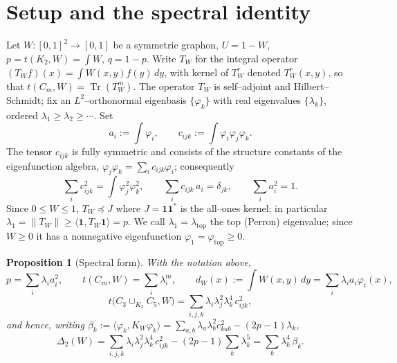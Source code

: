 \documentclass[11pt]{article}
\newtheorem{proposition}[theorem]{Proposition}
\theoremstyle{definition}
\newcommand{\one}{\mathbf 1}
\newcommand{\Tr}{\operatorname{Tr}}
\newcommand{\tw}{T_W}
\newcommand{\kw}{K_W}
\begin{document}
\tableofcontents

\section{Setup and the spectral identity}\label{sec:setup}

Let $W:[0,1]^2\to[0,1]$ be a symmetric graphon, $U=1-W$, $p=t(K_2,W)=\int W$,
$q=1-p$.  Write $\tw$ for the integral operator $(\tw f)(x)=\int W(x,y)f(y)\,dy$,
with kernel of $\tw^r$ denoted $\tw^r(x,y)$, so that $t(C_m,W)=\Tr(\tw^m)$.  The
operator $\tw$ is self--adjoint and Hilbert--Schmidt; fix an $L^2$--orthonormal
eigenbasis $\{\varphi_k\}$ with real eigenvalues $\{\lambda_k\}$, ordered
$\lambda_1\ge\lambda_2\ge\cdots$.  Set
\[
  a_i:=\int\varphi_i,\qquad
  c_{ijk}:=\int\varphi_i\varphi_j\varphi_k .
\]
The tensor $c_{ijk}$ is fully symmetric and consists of the structure constants
of the eigenfunction algebra, $\varphi_j\varphi_k=\sum_i c_{ijk}\varphi_i$;
consequently
\begin{equation}\label{eq:c-constraints}
  \sum_i c_{ijk}^2=\int\varphi_j^2\varphi_k^2,\qquad
  \sum_i c_{ijk}\,a_i=\delta_{jk},\qquad
  \sum_i a_i^2=1 .
\end{equation}
Since $0\le W\le1$, $\tw\preceq J$ where $J=\one\one^*$ is the all--ones kernel;
in particular $\lambda_1=\|\tw\|\ge\langle\one,\tw\one\rangle=p$.  We call
$\lambda_1=\lambda_{\mathrm{top}}$ the top (Perron) eigenvalue; since $W\ge0$ it
has a nonnegative eigenfunction $\varphi_1=\varphi_{\mathrm{top}}\ge0$.

\begin{proposition}[Spectral form]\label{prop:spectral}
With the notation above,
\[
  p=\sum_i\lambda_i a_i^2,\qquad
  t(C_m,W)=\sum_i\lambda_i^m,\qquad
  d_W(x):=\int W(x,y)\,dy=\sum_i\lambda_i a_i\varphi_i(x),
\]
\[
  t\big(C_3\cup_{K_2}C_5,W\big)=\sum_{i,j,k}\lambda_i\lambda_j^2\lambda_k^4\,c_{ijk}^2 ,
\]
and hence, writing $\beta_k:=\langle\varphi_k,\kw\varphi_k\rangle
=\sum_{a,b}\lambda_a\lambda_b^2 c_{kab}^2-(2p-1)\lambda_k$,
\begin{equation}\label{eq:permode}
  \Delta_2(W)=\sum_{i,j,k}\lambda_i\lambda_j^2\lambda_k^4\,c_{ijk}^2
  -(2p-1)\sum_k\lambda_k^5
  =\sum_k\lambda_k^4\,\beta_k .
\end{equation}
\end{proposition}
\end{document}
